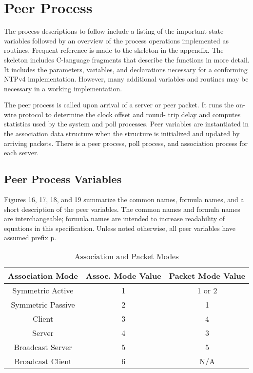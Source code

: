 \chapter{Peer Process}

The process descriptions to follow include a listing of the important
state variables followed by an overview of the process operations
implemented as routines. Frequent reference is made to the skeleton
in the appendix. The skeleton includes C-language fragments that
describe the functions in more detail. It includes the parameters,
variables, and declarations necessary for a conforming NTPv4
implementation. However, many additional variables and routines may
be necessary in a working implementation.

The peer process is called upon arrival of a server or peer packet.
It runs the on-wire protocol to determine the clock offset and round-
trip delay and computes statistics used by the system and poll
processes. Peer variables are instantiated in the association data
structure when the structure is initialized and updated by arriving
packets. There is a peer process, poll process, and association
process for each server.

\section{Peer Process Variables}

Figures 16, 17, 18, and 19 summarize the common names, formula names,
and a short description of the peer variables. The common names and
formula names are interchangeable; formula names are intended to
increase readability of equations in this specification. Unless
noted otherwise, all peer variables have assumed prefix p.

\begin{table}[htb]
\center
\begin{tabular}{c | c | c}
Association Mode & Assoc. Mode Value & Packet Mode Value \\
\hline
\hline
Symmetric Active & 1 & 1 or 2 \\
Symmetric Passive & 2 & 1 \\
Client & 3 & 4 \\
Server & 4 & 3 \\
Broadcast Server & 5 & 5 \\
Broadcast Client & 6 & N/A \\
\hline
\end{tabular}
\label{association_and_packet_modes}
\caption{Association and Packet Modes}
\end{table}

